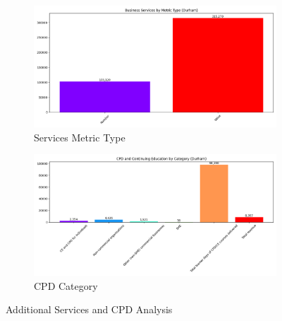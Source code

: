 \documentclass[journal,onecolumn, 10pt,draftclsnofoot]{IEEEtran}
\begin{document}
\begin{figure}[h]
    \centering
    \begin{subfigure}[b]{0.48\textwidth}
        \centering
        \includegraphics[width=\linewidth]{Fig/figure9.services_metric_type.png}
        \caption{Services Metric Type}
        \label{fig:services-metric-type}
    \end{subfigure}
    \hfill
    \begin{subfigure}[b]{0.48\textwidth}
        \centering
        \includegraphics[width=\linewidth]{Fig/figure11.cpd_category.png}
        \caption{CPD Category}
        \label{fig:cpd-category}
    \end{subfigure}
    \vspace{0.6cm}
    \caption{Additional Services and CPD Analysis}
    \label{fig:additional-services-cpd}
\end{figure}
\end{document}
